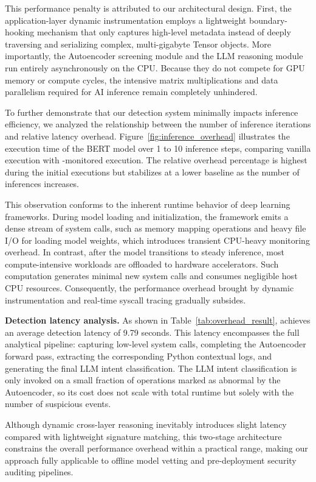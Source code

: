 This performance penalty is attributed to our architectural design. First, the application-layer dynamic instrumentation employs a lightweight boundary-hooking mechanism that only captures high-level metadata instead of deeply traversing and serializing complex, multi-gigabyte Tensor objects. More importantly, the Autoencoder screening module and the LLM reasoning module run entirely asynchronously on the CPU. Because they do not compete for GPU memory or compute cycles, the intensive matrix multiplications and data parallelism required for AI inference remain completely unhindered.

To further demonstrate that our detection system minimally impacts inference efficiency, we analyzed the relationship between the number of inference iterations and relative latency overhead. Figure~\ref{fig:inference_overhead} illustrates the execution time of the BERT model over 1 to 10 inference steps, comparing vanilla execution with \toolname{}-monitored execution. The relative overhead percentage is highest during the initial executions but stabilizes at a lower baseline as the number of inferences increases.

This observation conforms to the inherent runtime behavior of deep learning frameworks. During model loading and initialization, the framework emits a dense stream of system calls, such as memory mapping operations and heavy file I/O for loading model weights, which introduces transient CPU-heavy monitoring overhead. In contrast, after the model transitions to steady inference, most compute-intensive workloads are offloaded to hardware accelerators.  Such computation generates minimal new system calls and consumes negligible host CPU resources. Consequently, the performance overhead brought by dynamic instrumentation and real-time syscall tracing gradually subsides.

\noindent \textbf{Detection latency analysis.} As shown in Table~\ref{tab:overhead_result}, \toolname{} achieves an average detection latency of 9.79 seconds. This latency encompasses the full analytical pipeline: capturing low-level system calls, completing the Autoencoder forward pass, extracting the corresponding Python contextual logs, and generating the final LLM intent classification. The LLM intent classification is only invoked on a small fraction of operations marked as abnormal by the Autoencoder, so its cost does not scale with total runtime but solely with the number of suspicious events.

Although dynamic cross-layer reasoning inevitably introduces slight latency compared with lightweight signature matching, this two-stage architecture constrains the overall performance overhead within a practical range, making our approach fully applicable to offline model vetting and pre-deployment security auditing pipelines.

